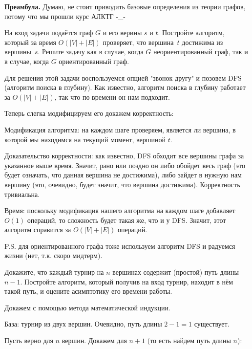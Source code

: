 \documentclass[12pt]{extreport}
\theoremstyle{definiton}
\theoremstyle{definition}
\theoremstyle{definition}
\newcounter{problem}
\newcounter{subproblem}
\def\beforPRskip{
	\bigskip
}
\def\pr{\beforPRskip\noindent\stepcounter{problem}{\bf \theproblem .\;}\setcounter{subproblem}{0}}
\def\prend{
	\bigskip
}
\begin{document}
	

\noindent\textbf{Преамбула.} Думаю, не стоит приводить базовые определения из теории графов, потому что мы прошли курс АЛКТГ -\_-
 
\prskip

        

\pr На вход задачи подаётся граф $G$ и его верины $s$ и $t$. Постройте алгоритм, который за время $O(|V| + |E|)$ проверяет, что вершина~$t$ достижима из вершины~$s$. Решите задачу как в случае, когда $G$ неориентированный граф, так и в случае, когда $G$ ориентированный граф.

	Для решения этой задачи воспользуемся опцией "звонок другу" и позовем DFS (алгоритм поиска в глубину). Как известно, алгоритм поиска в глубину работает за $O(|V| + |E|)$, так что по времени он нам подходит.

	Теперь слегка модифицируем его докажем корректность:

	Модификация алгоритма: на каждом шаге проверяем, является ли вершина, в которой мы находимся на текущий момент, вершиной $t$.

	Доказательство корректности: как известно, DFS обходит все вершины графа за указанное выше время. Значит, рано или поздно он либо обойдет весь граф (это будет означать, что данная вершина не достижима), либо зайдет в нужную нам вершину (это, очевидно, будет значит, что вершина достижима). Корректность тривиальна.

	Время: поскольку модификация нашего алгоритма на каждом шаге добавляет $O(1)$ операций, то сложность будет такая же, что и у DFS. Значит, этот алгоритм справится за $O(|V| + |E|)$ операций.

	P.S. для ориентированного графа тоже используем алгоритм DFS и радуемся жизни (нет, т.к. скоро мидтерм).

\pr Докажите, что каждый турнир на $n$ вершинах содержит (простой) путь длины $n-1$. Постройте алгоритм, который получив на вход турнир, находит в нём такой путь, и оцените асимптотику его времени работы.

\prend

	Докажем с помощью метода математической индукции.

	База: турнир из двух вершин. Очевидно, путь длины $2 - 1 = 1$ существует.

	Пусть верно для $n$ вершин. Докажем для $n + 1$ (то есть найдем путь длины $n$):
\end{document}
